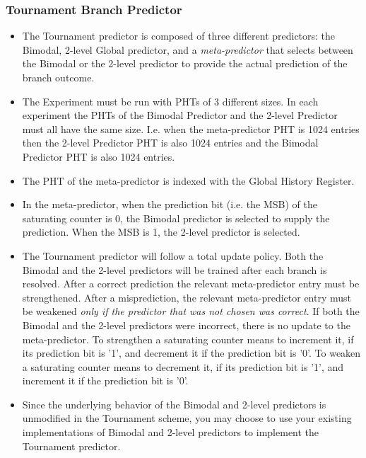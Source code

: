 \documentclass[a4paper,12pt]{article}
\theoremstyle{plain}
\begin{document}
\subsubsection*{Tournament Branch Predictor}
\begin{itemize}
\item The Tournament predictor is composed of three different predictors: the Bimodal, 2-level Global predictor, and a {\em meta-predictor} that selects between the Bimodal or the 2-level predictor to provide the actual prediction of the branch outcome. 
\item The Experiment must be run with PHTs of 3 different sizes. In each experiment the PHTs of the Bimodal Predictor and the 2-level Predictor must all have the same size. I.e. when the meta-predictor PHT is 1024 entries then the 2-level Predictor PHT is also 1024 entries and the Bimodal Predictor PHT is also 1024 entries.
\item The PHT of the meta-predictor is indexed with the Global History Register.
\item In the meta-predictor, when the prediction bit (i.e. the MSB) of the saturating counter is 0, the Bimodal predictor is selected to supply the prediction. When the MSB is 1, the 2-level predictor is selected.  
 
 
 \item The Tournament predictor will follow a total update policy. Both the Bimodal and the 2-level predictors will be trained after each branch is resolved. After a correct prediction the relevant meta-predictor entry must be strengthened. After a misprediction, the relevant meta-predictor entry must be weakened {\em only if the predictor that was not chosen was correct}. If both the Bimodal and the 2-level predictors were incorrect, there is no update to the meta-predictor. 
 \subitem{-} To strengthen a saturating counter means to increment it, if its prediction bit is '1', and decrement it if the prediction bit is '0'. 
 \subitem{-} To weaken a saturating counter means to decrement it, if its prediction bit is '1', and increment it if the prediction bit is '0'. 
 \item Since the underlying behavior of the Bimodal and 2-level predictors is unmodified in the Tournament scheme, you may choose to use your existing implementations of Bimodal and 2-level predictors to implement the Tournament predictor. 
  

\end{itemize}
\end{document}
